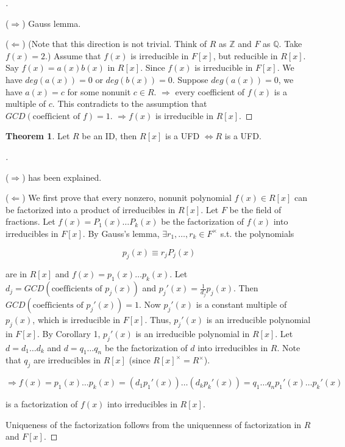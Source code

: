 \documentclass[12pt]{article}
\theoremstyle{definition}
\newtheorem{thm}{Theorem}
\newenvironment{proofs}[1][\proofname]{%
  \begin{proof}[#1]$ $\par\nobreak\ignorespaces
}{%
  \end{proof}
}
\begin{document}
\begin{proofs}
	($\Rightarrow$) Gauss lemma.
	\par ($\Leftarrow$) (Note that this direction is not trivial. Think of $R$ as $\mathbb{Z}$ and $F$ as $\mathbb{Q}$. Take $f(x) = 2$.) Assume that $f(x)$ is irreducible in $F[x]$, but reducible in $R[x]$. Say $f(x) = a(x) b(x)$ in $R[x]$. Since $f(x)$ is irreducible in $F[x]$. We have $deg(a(x)) = 0$ or $deg(b(x)) = 0$. Suppose $deg(a(x)) = 0$, we have $a(x) = c$ for some nonunit $c \in R$. $\Rightarrow$ every coefficient of $f(x)$ is a multiple of $c$. This contradicts to the assumption that $GCD(\text{coefficient of }f) = 1$. $\Rightarrow f(x)$ is irreducible in $R[x]$.

\end{proofs}

\begin{thm}
	Let $R$ be an ID, then $R[x]$ is a UFD $\Leftrightarrow  R$ is a UFD.
\end{thm}

\begin{proofs}
	($\Rightarrow$) has been explained.
	\par ($\Leftarrow$) We first prove that every nonzero, nonunit polynomial $f(x) \in R[x]$ can be factorized into a product of irreducibles in $R[x]$. Let $F$ be the field of fractions. Let $f(x) = P_1(x) \hdots P_k(x)$ be the factorization of $f(x)$ into irreducibles in $F[x]$. By Gauss's lemma, $\exists r_1, \hdots, r_k \in F^\times$ s.t. the polynomials

	$$p_j(x) \equiv r_j P_j(x)$$

	are in $R[x]$ and $f(x) = p_1(x) \hdots p_k(x)$. Let $d_j = GCD(\text{coefficients of }p_j(x))$ and $p_j'(x) = \frac{1}{d_j} p_j(x)$. Then $GCD(\text{coefficients of }p_j'(x)) = 1$. Now $p_j'(x)$ is a constant multiple of $p_j(x)$, which is irreducible in $F[x]$. Thus, $p_j'(x)$ is an irreducible polynomial in $F[x]$. By Corollary 1, $p_j'(x)$ is an irreducible polynomial in $R[x]$. Let $d = d_1 \hdots d_k$ and $d = q_1 \hdots q_n$ be the factorization of $d$ into irreducibles in $R$. Note that $q_j$ are irreducibles in $R[x]$ (since $R[x]^\times = R^\times$).

	$$\Rightarrow f(x) = p_1(x) \hdots p_k(x) = (d_1 p_1'(x)) \hdots (d_k p_k'(x)) = q_1 \hdots q_n p_1'(x) \hdots p_k'(x)$$

	is a factorization of $f(x)$ into irreducibles in $R[x]$.

	\par Uniqueness of the factorization follows from the uniquenness of factorization in $R$ and $F[x]$.

\end{proofs}
\end{document}
